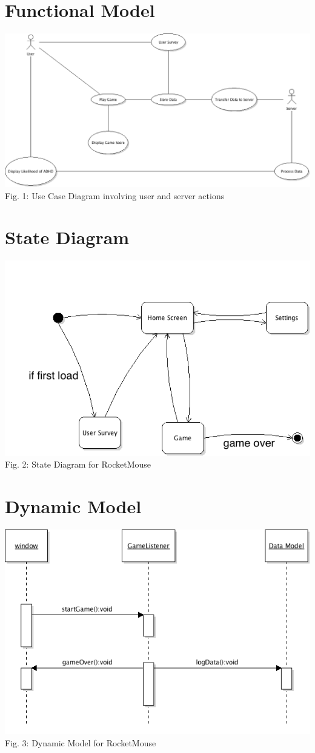 \documentclass[a4wide]{article}
\begin{document}
\section{Functional Model}
\includegraphics[width=\textwidth]{images/UseCaseDiagram.png}
\small Fig. 1: Use Case Diagram involving user and server actions
\section{State Diagram}
\includegraphics[width=\textwidth]{images/StateDiagram.png}
Fig. 2: State Diagram for RocketMouse

\section{Dynamic Model}
\includegraphics[width=\textwidth]{images/dynamicModel.png}
Fig. 3: Dynamic Model for RocketMouse
\end{document}

